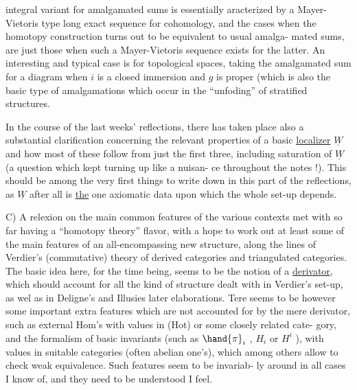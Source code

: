 
integral variant for amalgamated sums is essentially aracterized by a
Mayer-Vietoris type long exact sequence for cohomology,  and the cases
when the homotopy construction turns out to be equivalent to usual amalga-%
mated sums,  are  just those when such a Mayer-Vietoris sequence exists
for the latter.  An interesting and typical case is for topological spaces,
taking the amalgamated sum for a diagram
when $i$ is a closed immersion and $g$ is proper  (which is also the basic type
of amalgamations which occur in the ``unfoding'' of stratified structures\hand{)}.

In the course of the last weeks' reflections,  there has taken place
also a substantial clarification concerning the relevant properties of a
basic \uline{localizer} $\underline{W}$ and how most of these\hand{,} follow from just the first three,
including  saturation of $\underline{W}$\hand{,} (a question which kept turning up like a nuisan-%
ce throughout the notes !).  This should be among the very first things to
write down in this part of the reflections,  as $\underline{W}$ after all is \uline{the} one
axiomatic data upon which the whole set-up depends.

C)   A relexion on the main common features of the various contexts
met with so far having a ``homotopy theory'' flavor,  with a hope to 
work out at least some of the main features of an all-encompassing new
structure,  along the lines of Verdier's (commutative) theory of derived
categories and triangulated categories.  The basic idea here,  for the time
being,  seems to be the notion of a \uline{derivator},  which should account for
all the kind of structure dealt with in Verdier's set-up,  as wel as in
Deligne's and Illusies later elaborations.  Tere seems to be however some
important extra features which are not accounted for by the mere derivator,
such as external Hom's with values in (Hot) or some closely related cate-%
gory,  and the formalism of basic invariants (such as $\hand{\pi}_i$ , $H_i$ or $H^i$ ),
with values in suitable categories (often abelian one's),  which among
others allow to check weak equivalence.  Such features seem to be invariab-%
ly around in all cases I know of,  and they need to be understood I feel.

